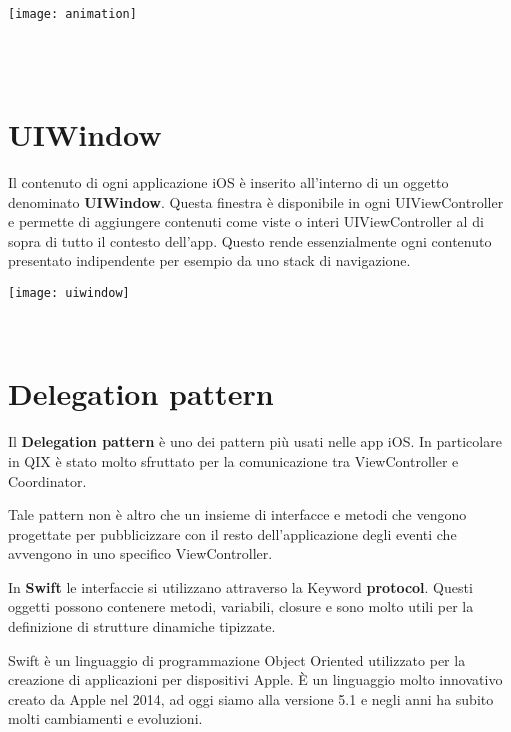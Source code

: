 \begin{minipage}{\linewidth}
    \centering
    \texttt{[image: animation]}
    \label{fig:6}
\end{minipage}\\\\

\section{UIWindow}\label{sec:uiwindow}

Il contenuto di ogni applicazione iOS è inserito all'interno di un oggetto denominato
\textbf{UIWindow}\cite{uiwindow}. Questa finestra è disponibile in ogni UIViewController e permette di aggiungere contenuti
come viste o interi UIViewController al di sopra di tutto il contesto dell'app. Questo rende essenzialmente ogni contenuto presentato
indipendente per esempio da uno stack di navigazione.

\begin{minipage}{\linewidth}
    \centering
    \texttt{[image: uiwindow]}
    \label{fig:7}
\end{minipage}\\


\section{Delegation pattern}\label{delegation}

Il \textbf{Delegation pattern} è uno dei pattern più usati nelle app iOS. In particolare in QIX
è stato molto sfruttato per la comunicazione tra ViewController e Coordinator.

Tale pattern non è altro che un insieme di interfacce e metodi che
vengono progettate per pubblicizzare con il resto dell'applicazione degli eventi che avvengono in uno specifico ViewController.

In \textbf{Swift} le interfaccie si utilizzano attraverso la Keyword \textbf{protocol}. Questi oggetti possono contenere metodi, variabili, closure
e sono molto utili per la definizione di strutture dinamiche tipizzate.

Swift è un linguaggio di programmazione Object Oriented utilizzato per la creazione di applicazioni per dispositivi Apple. È un
linguaggio molto innovativo creato da Apple nel 2014, ad oggi siamo alla versione 5.1 e negli anni ha subito molti cambiamenti e evoluzioni.

